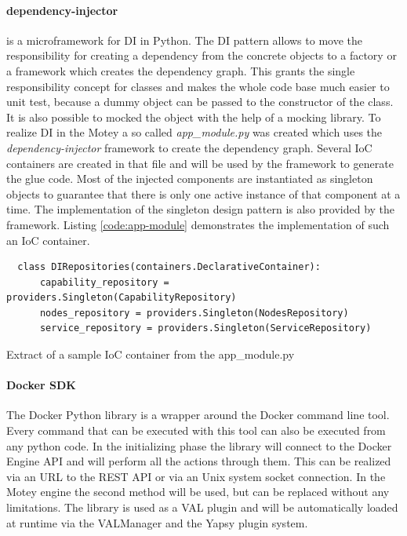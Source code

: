 \paragraph{dependency-injector} is a microframework for \acf{DI} in Python.
The \ac{DI} pattern allows to move the responsibility for creating a dependency from the concrete objects to a factory or a framework which creates the dependency graph.
This grants the single responsibility concept for classes and makes the whole code base much easier to unit test, because a dummy object can be passed to the constructor of the class.
It is also possible to mocked the object with the help of a mocking library.
To realize \ac{DI} in the Motey a so called \textit{app\_module.py} was created which uses the \textit{dependency-injector} framework to create the dependency graph.
Several \ac{IoC} containers are created in that file and will be used by the framework to generate the glue code.
Most of the injected components are instantiated as singleton objects to guarantee that there is only one active instance of that component at a time.
The implementation of the singleton design pattern is also provided by the framework.
Listing \ref{code:app-module} demonstrates the implementation of such an \ac{IoC} container.
\begin{listing}[H]
  \begin{verbatim}
  class DIRepositories(containers.DeclarativeContainer):
      capability_repository = providers.Singleton(CapabilityRepository)
      nodes_repository = providers.Singleton(NodesRepository)
      service_repository = providers.Singleton(ServiceRepository)
  \end{verbatim}
  \caption{Extract of a sample IoC container from the app\_module.py}
  \label{code:app-module}
\end{listing}

\paragraph{Docker \ac{SDK}}
The Docker Python library is a wrapper around the Docker command line tool.
Every command that can be executed with this tool can also be executed from any python code.
In the initializing phase the library will connect to the Docker Engine \ac{API} and will perform all the actions through them.
This can be realized via an \ac{URL} to the \ac{REST} \ac{API} or via an Unix system socket connection.
In the Motey engine the second method will be used, but can be replaced without any limitations.
The library is used as a \ac{VAL} plugin and will be automatically loaded at runtime via the VALManager and the Yapsy plugin system.

